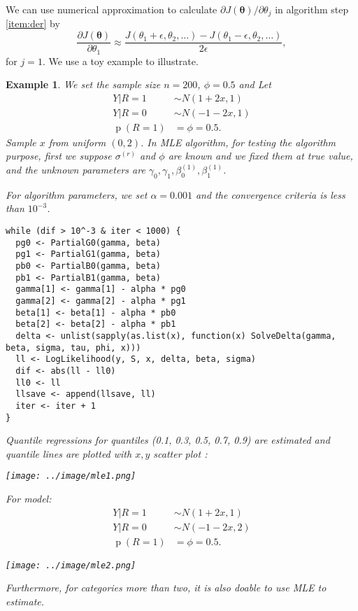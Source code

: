 \documentclass[12pt]{article}
\newtheorem{emp}[thm]{Example}
\DeclareMathOperator{\pr}{p}
\begin{document}
We can use numerical approximation to calculate $\partial J(\bm
\theta)/\partial \theta_j$ in algorithm step \ref{item:der} by
\begin{displaymath}
  \frac{\partial J(\bm \theta)}{\partial \theta_1} \approx \frac{J(\theta_1 + \epsilon, \theta_2, \ldots) - J(\theta_1 - \epsilon, \theta_2 , \ldots)}{2\epsilon}, 
\end{displaymath}
for $j = 1$. We use a toy example to illustrate.
\begin{emp}
  We set the sample size $n = 200$, $\phi = 0.5$ and Let
  \begin{align*}
    Y | R = 1 & \sim N(1 + 2x , 1)\\
    Y | R = 0 & \sim N( - 1 - 2x, 1) \\
    \pr (R = 1) & = \phi = 0.5.
  \end{align*}
  Sample $x$ from uniform $(0, 2)$. In MLE algorithm, for testing the
  algorithm purpose, first we suppose $\sigma^{(r)}$ and $\phi$ are
  known and we fixed them at true value, and the unknown parameters
  are $\gamma_0,\gamma_1, \beta_0^{(1)} , \beta_1^{(1)}$.

  For algorithm parameters, we set $\alpha = 0.001$ and the
  convergence criteria is less than $10^{-3}$.
\begin{verbatim}
while (dif > 10^-3 & iter < 1000) {
  pg0 <- PartialG0(gamma, beta)
  pg1 <- PartialG1(gamma, beta)
  pb0 <- PartialB0(gamma, beta)
  pb1 <- PartialB1(gamma, beta)
  gamma[1] <- gamma[1] - alpha * pg0
  gamma[2] <- gamma[2] - alpha * pg1
  beta[1] <- beta[1] - alpha * pb0
  beta[2] <- beta[2] - alpha * pb1
  delta <- unlist(sapply(as.list(x), function(x) SolveDelta(gamma, beta, sigma, tau, phi, x)))
  ll <- LogLikelihood(y, S, x, delta, beta, sigma)
  dif <- abs(ll - ll0)
  ll0 <- ll
  llsave <- append(llsave, ll)
  iter <- iter + 1
}
\end{verbatim}

  Quantile regressions for quantiles (0.1, 0.3, 0.5, 0.7, 0.9) are
  estimated and quantile lines are plotted with $x, y$ scatter plot :

  \texttt{[image: ../image/mle1.png]}

  For model:
  \begin{align*}
    Y | R = 1 & \sim N(1 + 2x , 1)\\
    Y | R = 0 & \sim N( - 1 - 2x, 2) \\
    \pr (R = 1) & = \phi = 0.5.
  \end{align*}

  \texttt{[image: ../image/mle2.png]}

  Furthermore, for categories more than two, it is also doable to use
  MLE to estimate.


\end{emp}
\end{document}
